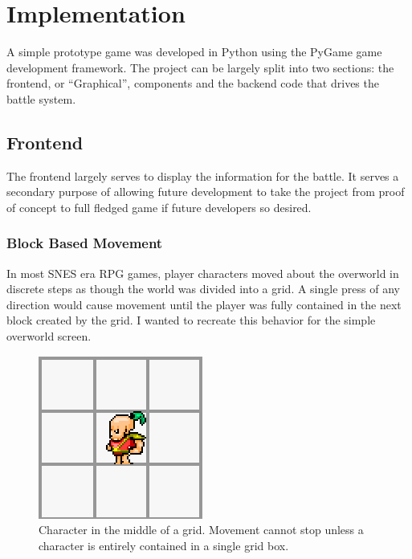 \documentclass[11pt]{article}
\begin{document}
\section{Implementation}

A simple prototype game was developed in Python using the PyGame game development framework.  The project can be largely split into two sections: the frontend, or ``Graphical'', components and the backend code that drives the battle system.  

\subsection{Frontend}

The frontend largely serves to display the information for the battle.  It serves a secondary purpose of allowing future development to take the project from proof of concept to full fledged game if future developers so desired.

\subsubsection{Block Based Movement}

In most SNES era RPG games, player characters moved about the overworld in discrete steps as though the world was divided into a grid.  A single press of any direction would cause movement until the player was fully contained in the next block created by the grid.  I wanted to recreate this behavior for the simple overworld screen.

\begin{figure}[h!]
\begin{center}
\leavevmode
\includegraphics[]{images/overworld_blocks}
\end{center}
\caption{Character in the middle of a grid.  Movement cannot stop unless 
         a character is entirely contained in a single grid box.}
\end{figure}
\end{document}
